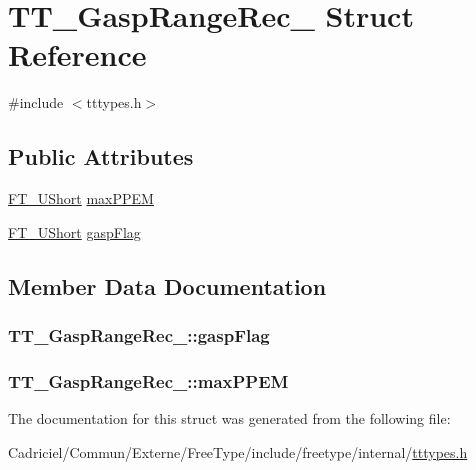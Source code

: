\hypertarget{struct_t_t___gasp_range_rec__}{\section{T\-T\-\_\-\-Gasp\-Range\-Rec\-\_\- Struct Reference}
\label{struct_t_t___gasp_range_rec__}
}


{\ttfamily \#include $<$tttypes.\-h$>$}

\subsection*{Public Attributes}
\begin{DoxyCompactItemize}
\item 
\hyperlink{fttypes_8h_a937f6c17cf5ffd09086d8610c37b9f58}{F\-T\-\_\-\-U\-Short} \hyperlink{struct_t_t___gasp_range_rec___aa3fab31f6c0659b4deff402e210e15c9}{max\-P\-P\-E\-M}
\item 
\hyperlink{fttypes_8h_a937f6c17cf5ffd09086d8610c37b9f58}{F\-T\-\_\-\-U\-Short} \hyperlink{struct_t_t___gasp_range_rec___a9fc298dc0e46d31507728ae25585118d}{gasp\-Flag}
\end{DoxyCompactItemize}


\subsection{Member Data Documentation}
\hypertarget{struct_t_t___gasp_range_rec___a9fc298dc0e46d31507728ae25585118d}{
\subsubsection[{gasp\-Flag}]{ T\-T\-\_\-\-Gasp\-Range\-Rec\-\_\-\-::gasp\-Flag}}\label{struct_t_t___gasp_range_rec___a9fc298dc0e46d31507728ae25585118d}
\hypertarget{struct_t_t___gasp_range_rec___aa3fab31f6c0659b4deff402e210e15c9}{
\subsubsection[{max\-P\-P\-E\-M}]{ T\-T\-\_\-\-Gasp\-Range\-Rec\-\_\-\-::max\-P\-P\-E\-M}}\label{struct_t_t___gasp_range_rec___aa3fab31f6c0659b4deff402e210e15c9}


The documentation for this struct was generated from the following file\-:\begin{DoxyCompactItemize}
\item 
Cadriciel/\-Commun/\-Externe/\-Free\-Type/include/freetype/internal/\hyperlink{tttypes_8h}{tttypes.\-h}\end{DoxyCompactItemize}
